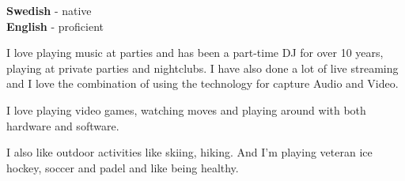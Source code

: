 \documentclass[9pt]{developercv} %
\begin{document}

\begin{minipage}[t]{0.3\textwidth}
  \vspace{-\baselineskip} %


  \textbf{Swedish} - native\\
  \textbf{English} - proficient
\end{minipage}
\hfill
\begin{minipage}[t]{0.7\textwidth}
  \vspace{-\baselineskip} %


  I love playing music at parties and has been a part-time DJ for over 10 years,
  playing at private parties and nightclubs. I have also done a lot of live streaming
  and I love the combination of using the technology for capture Audio and Video.

  I love playing video games, watching moves and playing around with both hardware
  and software.

  I also like outdoor activities like skiing, hiking. And I'm playing veteran
  ice hockey, soccer and padel and like being healthy.
\end{minipage}
\pagebreak


\end{document}
